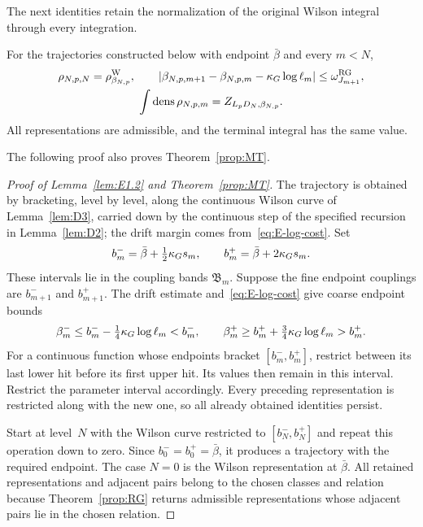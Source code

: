 The next identities retain the normalization of the original Wilson integral through every integration.
\begin{lemma}\label{lem:E1.2}
For the trajectories constructed below with endpoint $\bar\beta$ and every $m<N$,
\begin{gather*}
\rho_{N,p,N}=\rho^{\rm W}_{\beta_{N,p}},\qquad
|\beta_{N,p,m+1}-\beta_{N,p,m}-\kappa_G\log\ell_m|
\le\omega_{J_{m+1}}^{\rm RG},\\
\int\operatorname{dens}\rho_{N,p,m}=Z_{L_pD_N,\beta_{N,p}}.
\end{gather*}
All representations are admissible, and the terminal integral has the same value.
\end{lemma}
The following proof also proves Theorem~\ref{prop:MT}.
\begin{proof}[Proof of Lemma~\ref{lem:E1.2} and Theorem~\ref{prop:MT}]
The trajectory is obtained by bracketing, level by level, along the continuous Wilson curve of Lemma~\ref{lem:D3}, carried down by the continuous step of the specified recursion in Lemma~\ref{lem:D2}; the drift margin comes from~\eqref{eq:E-log-cost}. Set
\begin{equation*}
b_m^- =\bar\beta+\tfrac12\kappa_G s_m,\qquad
b_m^+ =\bar\beta+2\kappa_G s_m.
\end{equation*}
These intervals lie in the coupling bands $\mathfrak B_m$. Suppose the fine endpoint couplings are $b_{m+1}^-$ and $b_{m+1}^+$. The drift estimate and~\eqref{eq:E-log-cost} give coarse endpoint bounds
\begin{equation*}
\beta_m^-\le b_m^- -\tfrac14\kappa_G\log\ell_m<b_m^- ,
\qquad
\beta_m^+\ge b_m^+ +\tfrac34\kappa_G\log\ell_m>b_m^+ .
\end{equation*}
For a continuous function whose endpoints bracket $[b_m^-,b_m^+]$, restrict between its last lower hit before its first upper hit. Its values then remain in this interval. Restrict the parameter interval accordingly. Every preceding representation is restricted along with the new one, so all already obtained identities persist.

Start at level~$N$ with the Wilson curve restricted to $[b_N^-,b_N^+]$ and repeat this operation down to zero. Since $b_0^-=b_0^+=\bar\beta$, it produces a trajectory with the required endpoint. The case $N=0$ is the Wilson representation at $\bar\beta$. All retained representations and adjacent pairs belong to the chosen classes and relation because Theorem~\ref{prop:RG} returns admissible representations whose adjacent pairs lie in the chosen relation.


\end{proof}
